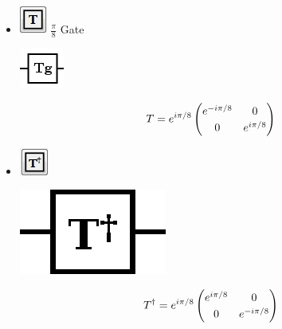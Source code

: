 \documentclass[10pt]{article}
\theoremstyle{definition}
\begin{document}
\begin{itemize}
\item \includegraphics{Figures/Gates/TGate.png}  $\frac{\pi}{8}$ Gate

\begin{center}
\includegraphics[scale=.7]{Figures/Gates/TGateViewer} \\
  \vspace*{3pt}
  \begin{minipage}{.9\linewidth}
    \begin{equation*} \label{mat:TGate}
    \renewcommand{\arraystretch}{1.25}
T = e^{i \pi/8}\begin{pmatrix} e^{-i\pi/8} & 0 \\ 0 & e^{i\pi/8} \end{pmatrix}
    \end{equation*}
  \end{minipage}\hspace{-2.5cm}
\end{center}

\item \includegraphics{Figures/Gates/TAdjointGate.png} 

\begin{center}
\includegraphics[scale=.7]{Figures/Gates/TAdjointGateViewer} \\
\vspace*{3pt}
\begin{minipage}{.9\linewidth}
    \begin{equation*} \label{mat:TGateAjoint}
    \renewcommand{\arraystretch}{1.25}
T^\dagger = e^{i \pi/8}\begin{pmatrix} e^{i\pi/8} & 0 \\ 0 & e^{-i\pi/8} \end{pmatrix}
    \end{equation*}
  \end{minipage}\hspace{-2.5cm}
\end{center}


\end{itemize}
\end{document}
